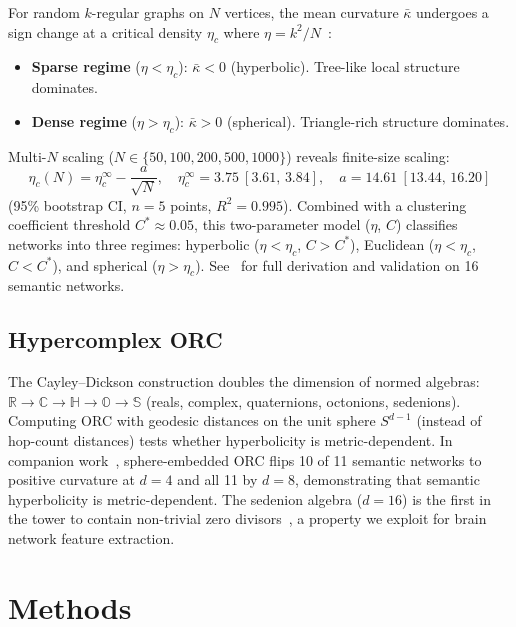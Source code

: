 \documentclass[11pt,a4paper]{article}
\newcommand{\kbar}{\bar{\kappa}}
\newcommand{\etac}{\eta_c}
\newcommand{\Cstar}{C^*}
\begin{document}
For random $k$-regular graphs on $N$ vertices, the mean curvature $\kbar$ undergoes a sign change at a critical density $\etac$ where $\eta = k^2/N$~\cite{mitsche2024curvature,bounded2025orc,agourakis2026theory}:
\begin{itemize}
    \item \textbf{Sparse regime} ($\eta < \etac$): $\kbar < 0$ (hyperbolic). Tree-like local structure dominates.
    \item \textbf{Dense regime} ($\eta > \etac$): $\kbar > 0$ (spherical). Triangle-rich structure dominates.
\end{itemize}
Multi-$N$ scaling ($N \in \{50, 100, 200, 500, 1000\}$) reveals finite-size scaling:
\begin{equation}
    \etac(N) = \eta_c^\infty - \frac{a}{\sqrt{N}}, \quad \eta_c^\infty = 3.75\ [3.61,\,3.84], \quad a = 14.61\ [13.44,\,16.20]
    \label{eq:scaling}
\end{equation}
(95\% bootstrap CI, $n=5$ points, $R^2=0.995$). Combined with a clustering coefficient threshold $\Cstar \approx 0.05$, this two-parameter model ($\eta$, $C$) classifies networks into three regimes: hyperbolic ($\eta < \etac$, $C > \Cstar$), Euclidean ($\eta < \etac$, $C < \Cstar$), and spherical ($\eta > \etac$). See~\cite{agourakis2026theory,agourakis2026semantic} for full derivation and validation on 16 semantic networks.

\subsection{Hypercomplex ORC}

The Cayley--Dickson construction doubles the dimension of normed algebras: $\mathbb{R} \to \mathbb{C} \to \mathbb{H} \to \mathbb{O} \to \mathbb{S}$ (reals, complex, quaternions, octonions, sedenions). Computing ORC with geodesic distances on the unit sphere $S^{d-1}$ (instead of hop-count distances) tests whether hyperbolicity is metric-dependent. In companion work~\cite{agourakis2026semantic}, sphere-embedded ORC flips 10 of 11 semantic networks to positive curvature at $d=4$ and all 11 by $d=8$, demonstrating that semantic hyperbolicity is metric-dependent. The sedenion algebra ($d=16$) is the first in the tower to contain non-trivial zero divisors~\cite{moreno1998zero}, a property we exploit for brain network feature extraction.

\section{Methods}
\label{sec:methods}
\end{document}
